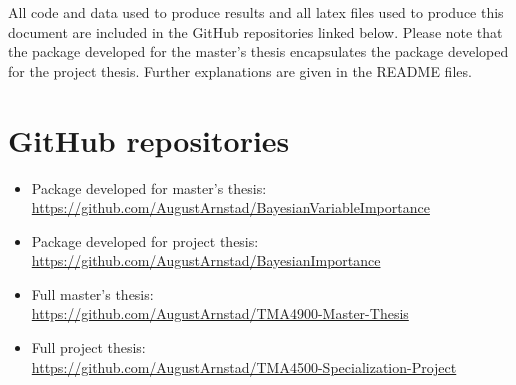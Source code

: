 All code and data used to produce results and all latex files used to produce this document are included in the GitHub repositories linked below. Please note that the package developed for the master's thesis encapsulates the package developed for the project thesis. Further explanations are given in the README files. 
\section*{GitHub repositories}
\begin{itemize}
    \item Package developed for master's thesis:\\
    \url{https://github.com/AugustArnstad/BayesianVariableImportance}
    \item Package developed for project thesis:\\
    \url{https://github.com/AugustArnstad/BayesianImportance}
    \item Full master's thesis:\\
    \url{https://github.com/AugustArnstad/TMA4900-Master-Thesis}
    \item Full project thesis:\\
    \url{https://github.com/AugustArnstad/TMA4500-Specialization-Project}
\end{itemize}
